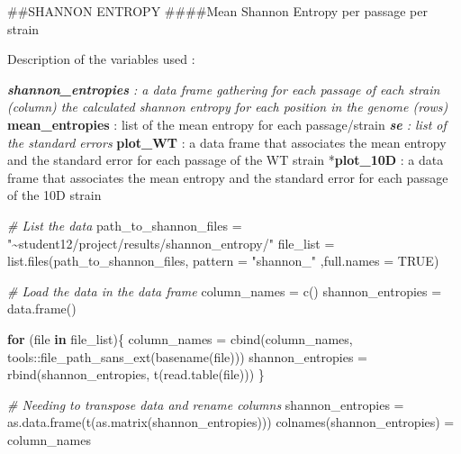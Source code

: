 \documentclass[
]{article}
\newenvironment{Shaded}{\begin{snugshade}}{\end{snugshade}}
\newcommand{\AttributeTok}[1]{\textcolor[rgb]{0.77,0.63,0.00}{#1}}
\newcommand{\CommentTok}[1]{\textcolor[rgb]{0.56,0.35,0.01}{\textit{#1}}}
\newcommand{\ConstantTok}[1]{\textcolor[rgb]{0.00,0.00,0.00}{#1}}
\newcommand{\ControlFlowTok}[1]{\textcolor[rgb]{0.13,0.29,0.53}{\textbf{#1}}}
\newcommand{\FunctionTok}[1]{\textcolor[rgb]{0.00,0.00,0.00}{#1}}
\newcommand{\NormalTok}[1]{#1}
\newcommand{\OtherTok}[1]{\textcolor[rgb]{0.56,0.35,0.01}{#1}}
\newcommand{\SpecialCharTok}[1]{\textcolor[rgb]{0.00,0.00,0.00}{#1}}
\newcommand{\StringTok}[1]{\textcolor[rgb]{0.31,0.60,0.02}{#1}}
\begin{document}
\#\#SHANNON ENTROPY \#\#\#\#Mean Shannon Entropy per passage per strain

Description of the variables used :

\emph{\textbf{shannon\_entropies} : a data frame gathering for each
passage of each strain (column) the calculated shannon entropy for each
position in the genome (rows) }\textbf{mean\_entropies} : list of the
mean entropy for each passage/strain \emph{\textbf{se} : list of the
standard errors }\textbf{plot\_WT} : a data frame that associates the
mean entropy and the standard error for each passage of the WT strain
*\textbf{plot\_10D} : a data frame that associates the mean entropy and
the standard error for each passage of the 10D strain

\begin{Shaded}
\begin{Highlighting}[]
\CommentTok{\# List the data}
\NormalTok{path\_to\_shannon\_files }\OtherTok{=} \StringTok{"\textasciitilde{}student12/project/results/shannon\_entropy/"}
\NormalTok{file\_list }\OtherTok{=} \FunctionTok{list.files}\NormalTok{(path\_to\_shannon\_files, }\AttributeTok{pattern =} \StringTok{"shannon\_"}\NormalTok{ ,}\AttributeTok{full.names =} \ConstantTok{TRUE}\NormalTok{)}

\CommentTok{\# Load the data in the data frame}
\NormalTok{column\_names }\OtherTok{=} \FunctionTok{c}\NormalTok{()}
\NormalTok{shannon\_entropies }\OtherTok{=} \FunctionTok{data.frame}\NormalTok{()}

\ControlFlowTok{for}\NormalTok{ (file }\ControlFlowTok{in}\NormalTok{ file\_list)\{}
\NormalTok{  column\_names }\OtherTok{=} \FunctionTok{cbind}\NormalTok{(column\_names, tools}\SpecialCharTok{::}\FunctionTok{file\_path\_sans\_ext}\NormalTok{(}\FunctionTok{basename}\NormalTok{(file)))}
\NormalTok{  shannon\_entropies }\OtherTok{=} \FunctionTok{rbind}\NormalTok{(shannon\_entropies, }\FunctionTok{t}\NormalTok{(}\FunctionTok{read.table}\NormalTok{(file)))}
\NormalTok{\}}

\CommentTok{\# Needing to transpose data and rename columns}
\NormalTok{shannon\_entropies }\OtherTok{=} \FunctionTok{as.data.frame}\NormalTok{(}\FunctionTok{t}\NormalTok{(}\FunctionTok{as.matrix}\NormalTok{(shannon\_entropies)))}
\FunctionTok{colnames}\NormalTok{(shannon\_entropies) }\OtherTok{=}\NormalTok{ column\_names}
\end{Highlighting}
\end{Shaded}
\end{document}
